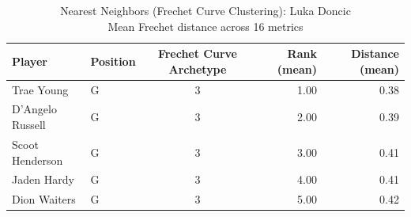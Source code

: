 \begin{table}[t]
\caption*{
{\fontsize{20}{25} Nearest Neighbors (Frechet Curve Clustering): Luka Doncic\fontsize{12}{15}\selectfont } \\ 
{\fontsize{14}{17}\selectfont  Mean Frechet distance across 16 metrics\fontsize{12}{15}\selectfont }
} 
\fontsize{12.0pt}{14.0pt}\selectfont
\begin{tabular*}{\linewidth}{@{\extracolsep{\fill}}llcrr}
\toprule
Player & Position & Frechet Curve Archetype & Rank (mean) & Distance (mean) \\ 
\midrule\addlinespace[2.5pt]
Trae Young & G & 3 & 1.00 & 0.38 \\ 
D'Angelo Russell & G & 3 & 2.00 & 0.39 \\ 
Scoot Henderson & G & 3 & 3.00 & 0.41 \\ 
Jaden Hardy & G & 3 & 4.00 & 0.41 \\ 
Dion Waiters & G & 3 & 5.00 & 0.42 \\ 
\bottomrule
\end{tabular*}
\end{table}

